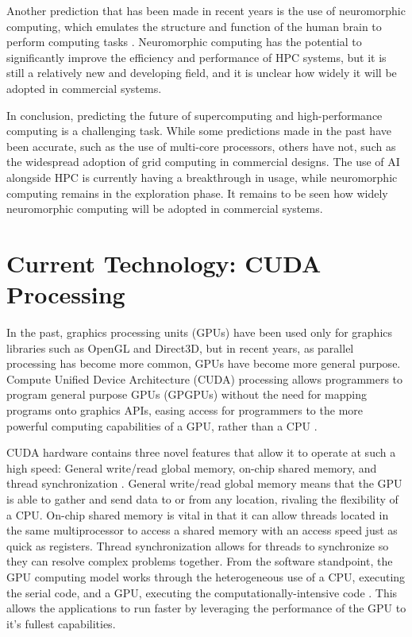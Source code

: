 \documentclass[twocolumn,12pt, singlespace]{IEEEtran}
\begin{document}
Another prediction that has been made in recent years is the use of neuromorphic computing, which emulates the structure and function of the human brain to perform computing tasks \cite{Merolla:2014}. Neuromorphic computing has the potential to significantly improve the efficiency and performance of HPC systems, but it is still a relatively new and developing field, and it is unclear how widely it will be adopted in commercial systems.

In conclusion, predicting the future of supercomputing and high-performance computing is a challenging task. While some predictions made in the past have been accurate, such as the use of multi-core processors, others have not, such as the widespread adoption of grid computing in commercial designs. The use of AI alongside HPC is currently having a breakthrough in usage, while neuromorphic computing remains in the exploration phase. It remains to be seen how widely neuromorphic computing will be adopted in commercial systems.

\section{Current Technology: CUDA Processing}
In the past, graphics processing units (GPUs) have been used only for graphics libraries such as OpenGL and Direct3D, but in recent years, as parallel processing has become more common, GPUs have become more general purpose. Compute Unified Device Architecture (CUDA) processing allows programmers to program general purpose GPUs (GPGPUs) without the need for mapping programs onto graphics APIs, easing access for programmers to the more powerful computing capabilities of a GPU, rather than a CPU \cite{Yang:2008}.

CUDA hardware contains three novel features that allow it to operate at such a high speed: General write/read global memory, on-chip shared memory, and thread synchronization \cite{Yang:2008}. General write/read global memory means that the GPU is able to gather and send data to or from any location, rivaling the flexibility of a CPU. On-chip shared memory is vital in that it can allow threads located in the same multiprocessor to access a shared memory with an access speed just as quick as registers. Thread synchronization allows for threads to synchronize so they can resolve complex problems together. From the software standpoint, the GPU computing model works through the heterogeneous use of a CPU, executing the serial code, and a GPU, executing the computationally-intensive code \cite{Ghorpade:2012}. This allows the applications to run faster by leveraging the performance of the GPU to it's fullest capabilities.
\end{document}
